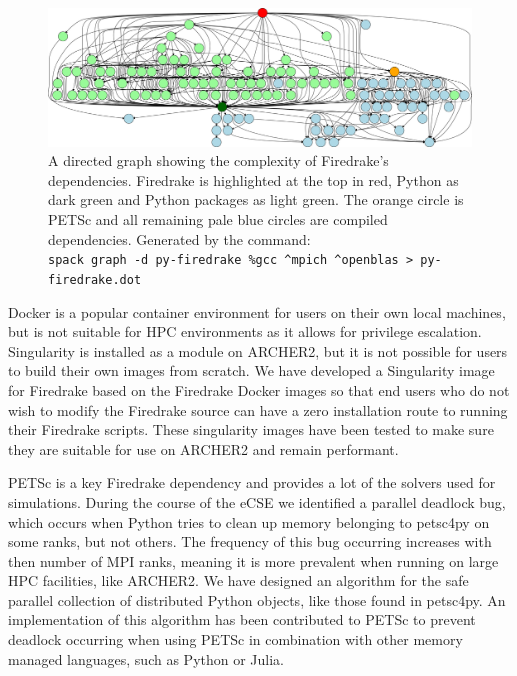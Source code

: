 \documentclass[a4paper,11pt]{article}
\begin{document}
\begin{figure}[htp]
	\centering
	\includegraphics[width=\textwidth]{firedrake_deps.png}
	\caption{A directed graph showing the complexity of Firedrake's dependencies. Firedrake is highlighted at the top in red, Python as dark green and Python packages as light green. The orange circle is PETSc and all remaining pale blue circles are compiled dependencies. Generated by the command:\\ \texttt{spack graph -d py-firedrake \%gcc \^{}mpich \^{}openblas \textgreater{} py-firedrake.dot}}
	\label{fig:fddeps}
\end{figure}

Docker is a popular container environment for users on their own local machines, but is not suitable for HPC environments as it allows for privilege escalation.
Singularity is installed as a module on ARCHER2, but it is not possible for users to build their own images from scratch.
We have developed a Singularity image for Firedrake based on the Firedrake Docker images so that end users who do not wish to modify the Firedrake source can have a zero installation route to running their Firedrake scripts.
These singularity images have been tested to make sure they are suitable for use on ARCHER2 and remain performant.

PETSc is a key Firedrake dependency and provides a lot of the solvers used for simulations.
During the course of the eCSE we identified a parallel deadlock bug, which occurs when Python tries to clean up memory belonging to petsc4py on some ranks, but not others.
The frequency of this bug occurring increases with then number of MPI ranks, meaning it is more prevalent when running on large HPC facilities, like ARCHER2.
We have designed an algorithm for the safe parallel collection of distributed Python objects, like those found in petsc4py.
An implementation of this algorithm has been contributed to PETSc to prevent deadlock occurring when using PETSc in combination with other memory managed languages, such as Python or Julia.
\end{document}
